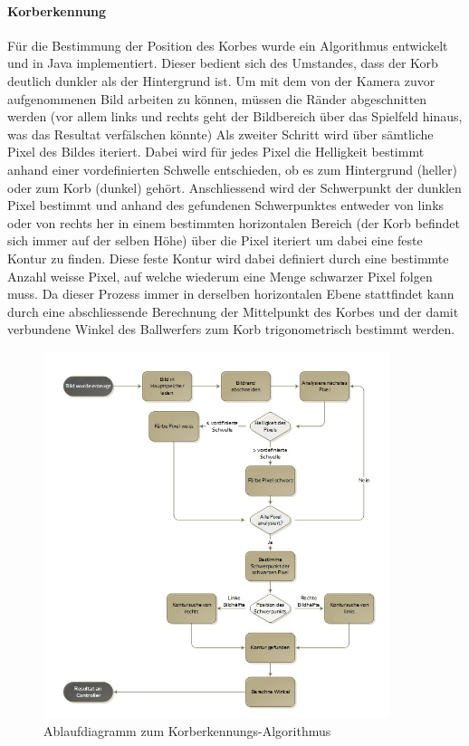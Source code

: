 	\paragraph{Korberkennung\\}
		Für die Bestimmung der Position des Korbes wurde ein Algorithmus entwickelt und in Java implementiert. 
		Dieser bedient sich des Umstandes, dass der Korb deutlich dunkler als der Hintergrund ist. 
		Um mit dem von der Kamera zuvor aufgenommenen Bild arbeiten zu können, müssen die Ränder abgeschnitten werden 
		(vor allem links und rechts geht der Bildbereich über das Spielfeld hinaus, was das Resultat verfälschen könnte) 
		Als zweiter Schritt wird über sämtliche Pixel des Bildes iteriert. Dabei wird für jedes Pixel die Helligkeit bestimmt 
		anhand einer vordefinierten Schwelle entschieden, ob es zum Hintergrund (heller) oder zum Korb (dunkel) gehört. 
		Anschliessend wird der Schwerpunkt der dunklen Pixel bestimmt und anhand des gefundenen Schwerpunktes entweder
		von links oder von rechts her in einem bestimmten horizontalen Bereich (der Korb befindet sich immer auf der selben Höhe)
		über die Pixel iteriert um dabei eine feste Kontur zu finden. Diese feste Kontur wird dabei definiert durch eine
		bestimmte Anzahl weisse Pixel, auf welche wiederum eine Menge schwarzer Pixel folgen muss. 
		Da dieser Prozess immer in derselben horizontalen Ebene stattfindet kann durch eine abschliessende Berechnung 
		der Mittelpunkt des Korbes und der damit verbundene Winkel des Ballwerfers zum Korb trigonometrisch bestimmt werden.\\
		\begin{figure}[h!]
			\centering
			\includegraphics[width=0.9\textwidth]{Enddokumentation/Loesungskonzept/Bilder/Flowchart_Korberkennung.jpg}
			\caption{Ablaufdiagramm zum Korberkennungs-Algorithmus}
			\label{fig:KorberkennungFlowchart}
		\end{figure}
		\newpage